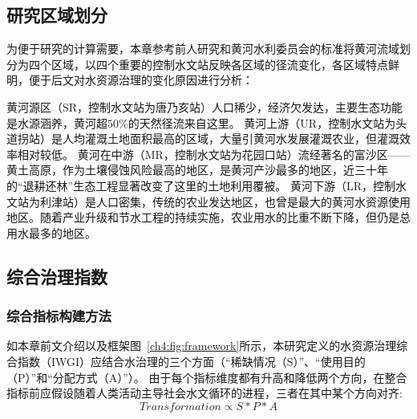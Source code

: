 \subsection{研究区域划分}\label{ch4:sec:region}

为便于研究的计算需要，本章参考前人研究和黄河水利委员会的标准将黄河流域划分为四个区域\cite{shuilibuhuangheshuiliweiyuanhui2010,wang2019f}，以四个重要的控制水文站反映各区域的径流变化，各区域特点鲜明，便于后文对水资源治理的变化原因进行分析：

黄河源区（SR，控制水文站为唐乃亥站）人口稀少，经济欠发达，主要生态功能是水源涵养，黄河超$50\%$的天然径流来自这里。
黄河上游（UR，控制水文站为头道拐站）是人均灌溉土地面积最高的区域，大量引黄河水发展灌溉农业，但灌溉效率相对较低。
黄河在中游（MR，控制水文站为花园口站）流经著名的富沙区——黄土高原，作为土壤侵蚀风险最高的地区，是黄河产沙最多的地区，近三十年的``退耕还林''生态工程显著改变了这里的土地利用覆被。
黄河下游（LR，控制水文站为利津站）是人口密集，传统的农业发达地区，也曾是最大的黄河水资源使用地区。随着产业升级和节水工程的持续实施，农业用水的比重不断下降，但仍是总用水最多的地区。



\subsection{综合治理指数}

\subsubsection{综合指标构建方法}

如本章前文介绍以及框架图~\ref{ch4:fig:framework}所示，本研究定义的水资源治理综合指数（IWGI）应结合水治理的三个方面（``稀缺情况（S）''、``使用目的（P）''和``分配方式（A）''）。
由于每个指标维度都有升高和降低两个方向，在整合指标前应假设随着人类活动主导社会\textendash{}水文循环的进程，三者在其中某个方向对齐:
\begin{equation}
    Transformation \propto S*P*A
\end{equation}

